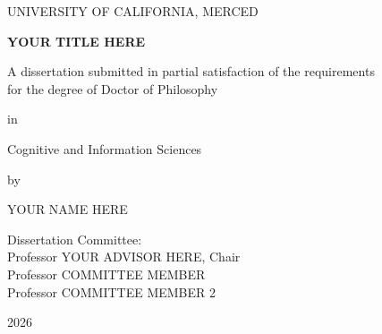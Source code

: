 \documentclass[12pt, oneside]{report}
\begin{document}
\begin{titlepage}
    \centering
    \begin{singlespacing}
        {UNIVERSITY OF CALIFORNIA, MERCED \par}
        
        \vspace{1.5in}
        
        {\bfseries \Large YOUR TITLE HERE \par}
        
        \vspace{1in}
        
        {A dissertation submitted in partial satisfaction of the requirements \\ 
        for the degree of Doctor of Philosophy \par}
        
        \vspace{0.3in}
        
        {in \par}
        \vspace{0.3in}
        {Cognitive and Information Sciences \par}
        
        \vspace{0.5in}
        
        {by \par}
        
        \vspace{0.5in}
        
        {YOUR NAME HERE \par}
        
        \vfill %
        
        \begin{flushright}
            Dissertation Committee: \\
            \hspace{1cm} Professor YOUR ADVISOR HERE, Chair \\
            \hspace{1cm} Professor COMMITTEE MEMBER \\
            \hspace{1cm} Professor COMMITTEE MEMBER 2
        \end{flushright}
        
        \vspace{0.5in}
        
        {2026 \par}
    \end{singlespacing}
\end{titlepage}
\end{document}
